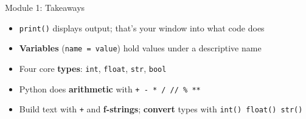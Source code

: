\documentclass[aspectratio=169]{beamer}
\begin{document}
\begin{frame}{Module 1: Takeaways}
\vspace{0.3cm}
\begin{itemize}\setlength\itemsep{9pt}
  \item[\textcolor{wurgreen}{\faCheck}] \texttt{print()} displays output; that's your window into what code does
  \item[\textcolor{wurgreen}{\faCheck}] \textbf{Variables} (\texttt{name = value}) hold values under a descriptive name
  \item[\textcolor{wurgreen}{\faCheck}] Four core \textbf{types}: \texttt{int}, \texttt{float}, \texttt{str}, \texttt{bool}
  \item[\textcolor{wurgreen}{\faCheck}] Python does \textbf{arithmetic} with \texttt{+ - * / // \% **}
  \item[\textcolor{wurgreen}{\faCheck}] Build text with \texttt{+} and \textbf{f-strings}; \textbf{convert} types with \texttt{int() float() str()}
\end{itemize}
\medskip
{}
\end{frame}
\end{document}
